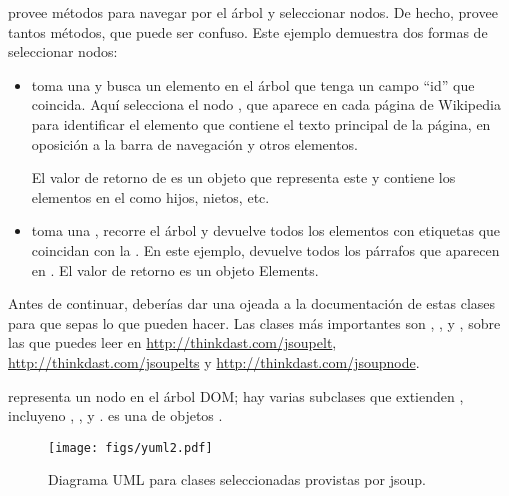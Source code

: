 \documentclass[12pt]{book}
\theoremstyle{exercise}
\begin{document}

 provee métodos para navegar por el árbol y
seleccionar nodos. De hecho, provee tantos métodos, que puede ser
confuso. Este ejemplo demuestra dos formas de seleccionar nodos:

\begin{itemize}

\item
   toma una  y busca un elemento en el árbol
  que tenga un campo ``id'' que coincida. Aquí selecciona el nodo
  ,
  que aparece en cada página de Wikipedia para identificar el elemento
   que contiene el texto principal de la página, en oposición
  a la barra de navegación y otros elementos.

  El valor de retorno de  es un objeto 
  que representa este  y contiene los elementos en el 
  como hijos, nietos, etc.

\item
   toma una , recorre el árbol y devuelve todos
  los elementos con etiquetas que coincidan con la . En este
  ejemplo, devuelve todos los párrafos que aparecen en . El
  valor de retorno es un objeto {Elements}.

\end{itemize}


Antes de continuar, deberías dar una ojeada a la documentación de estas clases para
que sepas lo que pueden hacer. Las clases más importantes son
, , y , sobre las que puedes leer en
\url{http://thinkdast.com/jsoupelt},
\url{http://thinkdast.com/jsoupelts} y
\url{http://thinkdast.com/jsoupnode}.

 representa un nodo en el árbol DOM; hay varias
subclases que extienden , incluyeno 
, ,  y .
 es una  de objetos .


\begin{figure}
\centering
\texttt{[image: figs/yuml2.pdf]}
\caption{Diagrama UML para clases seleccionadas provistas por jsoup.}
\label{fig-uml2}
\end{figure}
\end{document}
